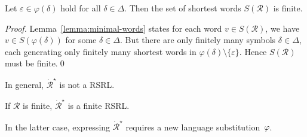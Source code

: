 \documentclass[envcountsame]{llncs}
\newcommand{\rationalset}{\ensuremath{\mathcal{R}}\xspace}
\newcommand{\RegularlyGeneratedLanguageSetAbbrev}{RSRL\xspace}
\begin{document}
\begin{corollary}
  \label{cor:finite-number-of-shortest-words}
  Let $\varepsilon \in \varphi(\delta)$ hold for all $\delta \in
  \Delta$.
Then the set of shortest words $S(\rationalset)$ is finite.
\end{corollary}

\begin{proof}
  Lemma~\ref{lemma:minimal-words} states for each word $v\in
  S(\rationalset)$, we have $v\in S(\varphi(\delta))$ for some
  $\delta\in\Delta$.
But there are only finitely many symbols $\delta\in\Delta$, each
  generating only finitely many shortest words in
  $\varphi(\delta)\setminus\{\varepsilon\}$. 
Hence $S(\rationalset)$ must be finite.\qed
\end{proof}




\begin{proposition}
  \label{prop:closure:pw-star}
  \begin{inparaenum}
  \item\label{prop:closure:pw-star:a} In general,
    $\dot{\rationalset}^\star$ is not a \RegularlyGeneratedLanguageSetAbbrev.
  \item\label{prop:closure:pw-star:b} If $\rationalset$ is finite,
    $\dot{\rationalset}^\star$ is a finite \RegularlyGeneratedLanguageSetAbbrev.
  \item\label{prop:closure:pw-star:c} In the latter case, expressing
    $\dot{\rationalset}^\star$ requires a new language
    substitution~$\varphi$.
\end{inparaenum}
\end{proposition}
\end{document}
